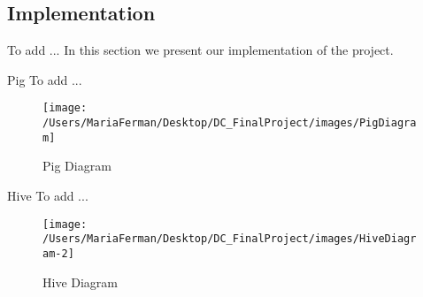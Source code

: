 \subsection{Implementation}
To add ...
In this section we present our implementation of the project.  

Pig To add ...
\begin{figure}[h!]
	\begin{center}
		\texttt{[image: /Users/MariaFerman/Desktop/DC\_FinalProject/images/PigDiagram]}
		\caption{Pig Diagram}
		\label{fig:dataDiagr}
	\end{center}
	\vspace{-10pt}
\end{figure}

Hive To add ...
\begin{figure}[h!]
	\begin{center}
		\texttt{[image: /Users/MariaFerman/Desktop/DC\_FinalProject/images/HiveDiagram-2]}
		\caption{Hive Diagram}
		\label{fig:dataDiagr}
	\end{center}
	\vspace{-10pt}
\end{figure}


